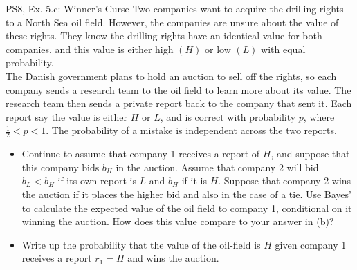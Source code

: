 \begin{frame}{PS8, Ex. 5.c: Winner's Curse}
      Two companies want to acquire the drilling rights to a North Sea oil field. However, the companies are unsure about the value of these rights. They know the drilling rights have an identical value for both companies, and this value is either high $(H)$ or low $(L)$ with equal probability.\\\smallskip
      The Danish government plans to hold an auction to sell off the rights, so each company sends a research team to the oil field to learn more about its value. The research team then sends a private report back to the company that sent it. Each report say the value is either $H$ or $L$, and is correct with probability $p$, where $\frac{1}{2} < p < 1$. The probability of a mistake is independent across the two reports.
      \vspace{-2pt}
      \begin{itemize}
        \item[(c)] Continue to assume that company 1 receives a report of $H$, and suppose that this company bids $b_H$ in the auction. Assume that company 2 will bid $b_L < b_H$ if its own report is $L$ and $b_H$ if it is $H$. Suppose that company 2 wins the auction if it places the higher bid and also in the case of a tie. Use Bayes’ to calculate the expected value of the oil field to company 1, conditional on it winning the auction. How does this value compare to your answer in (b)?
        \item[Step 1:] Write up the probability that the value of the oil-field is $H$ given company 1 receives a report $r_1=H$ and wins the auction.
        \end{itemize}
      \vfill\null
\end{frame}
